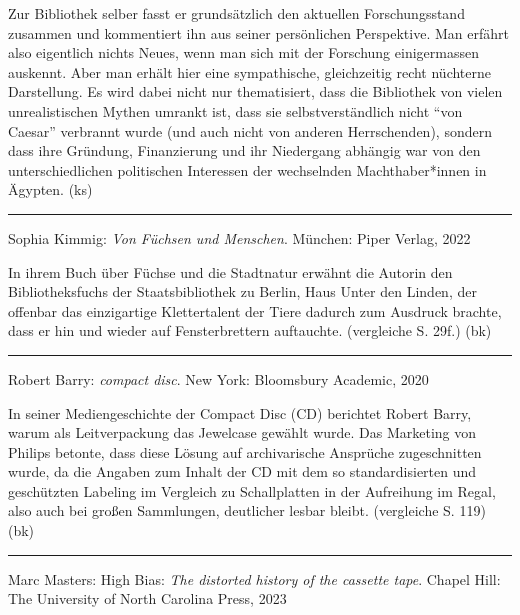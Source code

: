 \documentclass[a4paper,
fontsize=11pt,
oneside,
numbers=noperiodatend,
parskip=half-,
bibliography=totoc,
final
]{scrartcl}
\begin{document}
Zur Bibliothek selber fasst er grundsätzlich den aktuellen
Forschungsstand zusammen und kommentiert ihn aus seiner persönlichen
Perspektive. Man erfährt also eigentlich nichts Neues, wenn man sich mit
der Forschung einigermassen auskennt. Aber man erhält hier eine
sympathische, gleichzeitig recht nüchterne Darstellung. Es wird dabei
nicht nur thematisiert, dass die Bibliothek von vielen unrealistischen
Mythen umrankt ist, dass sie selbstverständlich nicht \enquote{von
Caesar} verbrannt wurde (und auch nicht von anderen Herrschenden),
sondern dass ihre Gründung, Finanzierung und ihr Niedergang abhängig war
von den unterschiedlichen politischen Interessen der wechselnden
Machthaber*innen in Ägypten. (ks)

\begin{center}\rule{0.5\linewidth}{0.5pt}\end{center}

Sophia Kimmig: \emph{Von Füchsen und Menschen}. München: Piper Verlag,
2022

In ihrem Buch über Füchse und die Stadtnatur erwähnt die Autorin den
Bibliotheksfuchs der Staatsbibliothek zu Berlin, Haus Unter den Linden,
der offenbar das einzigartige Klettertalent der Tiere dadurch zum
Ausdruck brachte, dass er hin und wieder auf Fensterbrettern auftauchte.
(vergleiche S. 29f.) (bk)

\begin{center}\rule{0.5\linewidth}{0.5pt}\end{center}

Robert Barry: \emph{compact disc}. New York: Bloomsbury Academic, 2020

In seiner Mediengeschichte der Compact Disc (CD) berichtet Robert Barry,
warum als Leitverpackung das Jewelcase gewählt wurde. Das Marketing von
Philips betonte, dass diese Lösung auf archivarische Ansprüche
zugeschnitten wurde, da die Angaben zum Inhalt der CD mit dem so
standardisierten und geschützten Labeling im Vergleich zu Schallplatten
in der Aufreihung im Regal, also auch bei großen Sammlungen, deutlicher
lesbar bleibt. (vergleiche S. 119) (bk)

\begin{center}\rule{0.5\linewidth}{0.5pt}\end{center}

Marc Masters: High Bias: \emph{The distorted history of the cassette
tape}. Chapel Hill: The University of North Carolina Press, 2023
\end{document}
